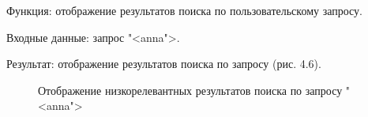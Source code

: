 Функция: отображение результатов поиска по пользовательскому запросу.

Входные данные: запрос "<anna">.

Результат: отображение результатов поиска по запросу (рис. 4.6).

\begin{figure}[H]
\caption{Отображение низкорелевантных результатов поиска по запросу "<anna">}
\label{tests/web.png:image}
\end{figure}